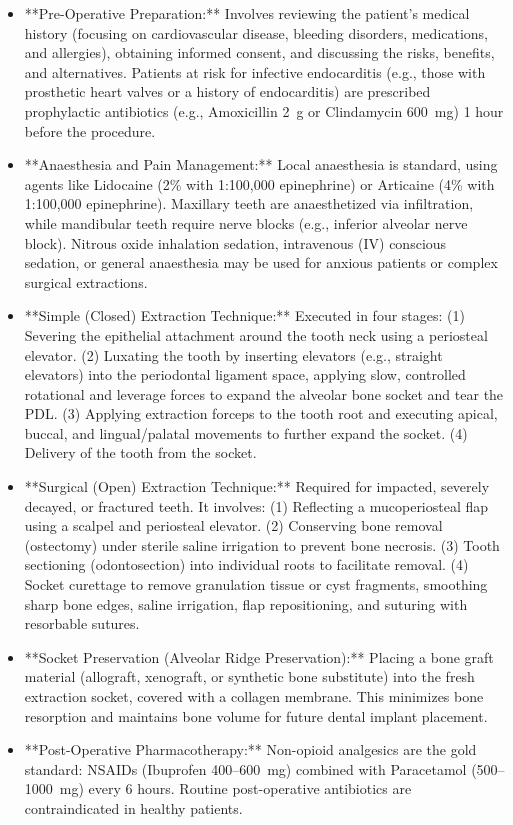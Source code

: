 \begin{itemize}
  \item **Pre-Operative Preparation:** Involves reviewing the patient's medical history (focusing on cardiovascular disease, bleeding disorders, medications, and allergies), obtaining informed consent, and discussing the risks, benefits, and alternatives. Patients at risk for infective endocarditis (e.g., those with prosthetic heart valves or a history of endocarditis) are prescribed prophylactic antibiotics (e.g., Amoxicillin 2~g or Clindamycin 600~mg) 1 hour before the procedure.
  \item **Anaesthesia and Pain Management:** Local anaesthesia is standard, using agents like Lidocaine (2\% with 1:100,000 epinephrine) or Articaine (4\% with 1:100,000 epinephrine). Maxillary teeth are anaesthetized via infiltration, while mandibular teeth require nerve blocks (e.g., inferior alveolar nerve block). Nitrous oxide inhalation sedation, intravenous (IV) conscious sedation, or general anaesthesia may be used for anxious patients or complex surgical extractions.
  \item **Simple (Closed) Extraction Technique:** Executed in four stages: (1) Severing the epithelial attachment around the tooth neck using a periosteal elevator. (2) Luxating the tooth by inserting elevators (e.g., straight elevators) into the periodontal ligament space, applying slow, controlled rotational and leverage forces to expand the alveolar bone socket and tear the PDL. (3) Applying extraction forceps to the tooth root and executing apical, buccal, and lingual/palatal movements to further expand the socket. (4) Delivery of the tooth from the socket.
  \item **Surgical (Open) Extraction Technique:** Required for impacted, severely decayed, or fractured teeth. It involves: (1) Reflecting a mucoperiosteal flap using a scalpel and periosteal elevator. (2) Conserving bone removal (ostectomy) under sterile saline irrigation to prevent bone necrosis. (3) Tooth sectioning (odontosection) into individual roots to facilitate removal. (4) Socket curettage to remove granulation tissue or cyst fragments, smoothing sharp bone edges, saline irrigation, flap repositioning, and suturing with resorbable sutures.
  \item **Socket Preservation (Alveolar Ridge Preservation):** Placing a bone graft material (allograft, xenograft, or synthetic bone substitute) into the fresh extraction socket, covered with a collagen membrane. This minimizes bone resorption and maintains bone volume for future dental implant placement.
  \item **Post-Operative Pharmacotherapy:** Non-opioid analgesics are the gold standard: NSAIDs (Ibuprofen 400--600~mg) combined with Paracetamol (500--1000~mg) every 6 hours. Routine post-operative antibiotics are contraindicated in healthy patients.
\end{itemize}

